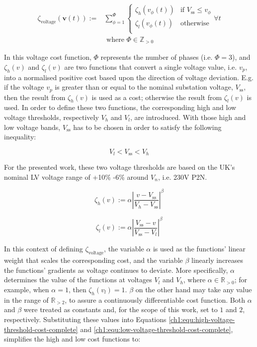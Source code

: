 \begin{equation}
\begin{split}
	\zeta_\text{voltage}(\textbf{v}(t)) :=& \sum_{\phi=1}^{\Phi}{\begin{cases}
		\zeta_h(v_{\phi}(t)) & \text{if } V_\text{ss} \leq v_\phi\\
		\zeta_l(v_{\phi}(t)) & \text{otherwise}\\
	\end{cases}} \forall t\\
	&\text{ where } \Phi \in \mathbb{Z}_{>0}
\end{split}
\label{ch1:equ:voltage-deviation}
\end{equation}

In this voltage cost function, $\Phi$ represents the number of phases (i.e. $\Phi = 3$), and $\zeta_h(v)$ and $\zeta_l(v)$ are two functions that convert a single voltage value, i.e. $v_p$, into a normalised positive cost based upon the direction of voltage deviation.
E.g. if the voltage $v_p$ is greater than or equal to the nominal substation voltage, $V_\text{ss}$, then the result from $\zeta_h(v)$ is used as a cost; otherwise the result from $\zeta_l(v)$ is used.
In order to define these two functions, the corresponding high and low voltage thresholds, respectively $V_h$ and $V_l$, are introduced.
With those high and low voltage bands, $V_\text{ss}$ has to be chosen in order to satisfy the following inequality:

\begin{equation}
	V_l < V_\text{ss} < V_h
\end{equation}

For the presented work, these two voltage thresholds are based on the UK's nominal LV voltage range of +10\% -6\% around $V_n$, i.e. 230V P2N.

\begin{equation}
	\zeta_h(v) := \alpha \left|\frac{v-V_\text{ss}}{V_h-V_\text{ss}}\right|^{\beta}
	\label{ch1:equ:high-voltage-threshold-cost-complete}
\end{equation}

\begin{equation}
	\zeta_l(v) := \alpha \left|\frac{V_\text{ss}-v}{V_\text{ss}-V_l}\right|^{\beta}
	\label{ch1:equ:low-voltage-threshold-cost-complete}
\end{equation}

In this context of defining $\zeta_\text{voltage}$, the variable $\alpha$ is used as the functions' linear weight that scales the corresponding cost, and the variable $\beta$ linearly increases the functions' gradients as voltage continues to deviate.
More specifically, $\alpha$ determines the value of the functions at voltages $V_l$ and $V_h$, where $\alpha \in \mathbb{R}_{>0}$; for example, when $\alpha = 1$, then $\zeta_{h}(v_l) = 1$.
$\beta$ on the other hand may take any value in the range of $\mathbb{R}_{>2}$, to assure a continuously differentiable cost function.
Both $\alpha$ and $\beta$ were treated as constants and, for the scope of this work, set to $1$ and $2$, respectively.
Substituting these values into Equations \ref{ch1:equ:high-voltage-threshold-cost-complete} and \ref{ch1:equ:low-voltage-threshold-cost-complete}, simplifies the high and low cost functions to:

